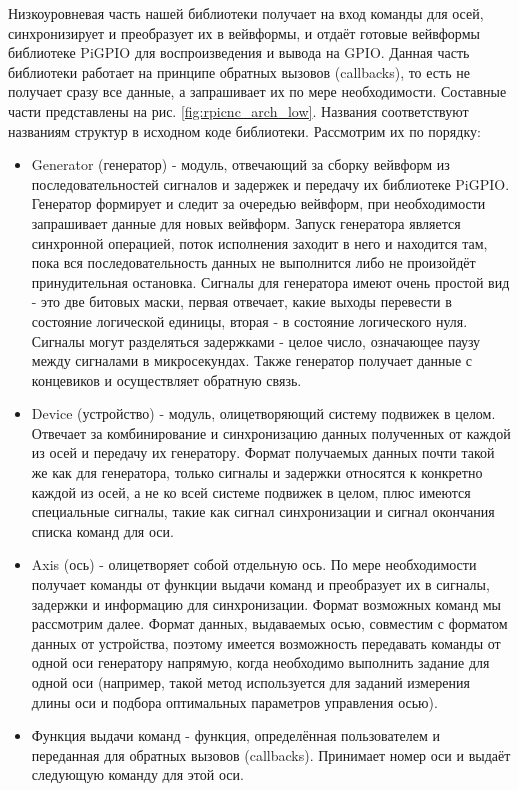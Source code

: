 \documentclass[14pt,russian,a4paper]{extarticle}
\begin{document}
Низкоуровневая часть нашей библиотеки получает на вход команды для осей, синхронизирует и преобразует их в вейвформы, и отдаёт готовые вейвформы библиотеке PiGPIO для воспроизведения и вывода на GPIO. Данная часть библиотеки работает на принципе обратных вызовов (callbacks), то есть не получает сразу все данные, а запрашивает их по мере необходимости. Составные части представлены на рис. \ref{fig:rpicnc_arch_low}. Названия соответствуют названиям структур в исходном коде библиотеки. Рассмотрим их по порядку:
\begin{itemize}
    \item Generator (генератор) - модуль, отвечающий за сборку вейвформ из последовательностей сигналов и задержек и передачу их библиотеке PiGPIO. Генератор формирует и следит за очередью вейвформ, при необходимости запрашивает данные для новых вейвформ. Запуск генератора является синхронной операцией, поток исполнения заходит в него и находится там, пока вся последовательность данных не выполнится либо не произойдёт принудительная остановка. Сигналы для генератора имеют очень простой вид - это две битовых маски, первая отвечает, какие выходы перевести в состояние логической единицы, вторая - в состояние логического нуля. Сигналы могут разделяться задержками - целое число, означающее паузу между сигналами в микросекундах. Также генератор получает данные с концевиков и осуществляет обратную связь.
    \item Device (устройство) - модуль, олицетворяющий систему подвижек в целом. Отвечает за комбинирование и синхронизацию данных полученных от каждой из осей и передачу их генератору. Формат получаемых данных почти такой же как для генератора, только сигналы и задержки относятся к конкретно каждой из осей, а не ко всей системе подвижек в целом, плюс имеются специальные сигналы, такие как сигнал синхронизации и сигнал окончания списка команд для оси.
    \item Axis (ось) - олицетворяет собой отдельную ось. По мере необходимости получает команды от функции выдачи команд и преобразует их в сигналы, задержки и информацию для синхронизации. Формат возможных команд мы рассмотрим далее. Формат данных, выдаваемых осью, совместим с форматом данных от устройства, поэтому имеется возможность передавать команды от одной оси генератору напрямую, когда необходимо выполнить задание для одной оси (например, такой метод используется для заданий измерения длины оси и подбора оптимальных параметров управления осью).
    \item Функция выдачи команд - функция, определённая пользователем и переданная для обратных вызовов (callbacks). Принимает номер оси и выдаёт следующую команду для этой оси.
\end{itemize}
\end{document}
